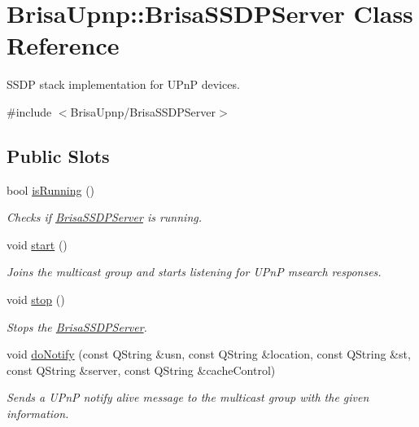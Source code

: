 \hypertarget{classBrisaUpnp_1_1BrisaSSDPServer}{
\section{BrisaUpnp::BrisaSSDPServer Class Reference}
\label{classBrisaUpnp_1_1BrisaSSDPServer}
}


SSDP stack implementation for UPnP devices.  


{\ttfamily \#include $<$BrisaUpnp/BrisaSSDPServer$>$}\subsection*{Public Slots}
\begin{DoxyCompactItemize}
\item 
bool \hyperlink{classBrisaUpnp_1_1BrisaSSDPServer_ac6e15aabc0f27fbea5214b6eb134abc6}{isRunning} ()
\begin{DoxyCompactList}\small\item\em Checks if \hyperlink{classBrisaUpnp_1_1BrisaSSDPServer}{BrisaSSDPServer} is running. \item\end{DoxyCompactList}\item 
void \hyperlink{classBrisaUpnp_1_1BrisaSSDPServer_a76ec5ae1f66a8ee27241c7b0a629d9a4}{start} ()
\begin{DoxyCompactList}\small\item\em Joins the multicast group and starts listening for UPnP msearch responses. \item\end{DoxyCompactList}\item 
void \hyperlink{classBrisaUpnp_1_1BrisaSSDPServer_a681a0e4e49df9c97862cda09d27642a7}{stop} ()
\begin{DoxyCompactList}\small\item\em Stops the \hyperlink{classBrisaUpnp_1_1BrisaSSDPServer}{BrisaSSDPServer}. \item\end{DoxyCompactList}\item 
void \hyperlink{classBrisaUpnp_1_1BrisaSSDPServer_ac1ea6c85983ed106c4dee300e7500b74}{doNotify} (const QString \&usn, const QString \&location, const QString \&st, const QString \&server, const QString \&cacheControl)
\begin{DoxyCompactList}\small\item\em Sends a UPnP notify alive message to the multicast group with the given information. \item\end{DoxyCompactList}\item 

\end{DoxyCompactItemize}
